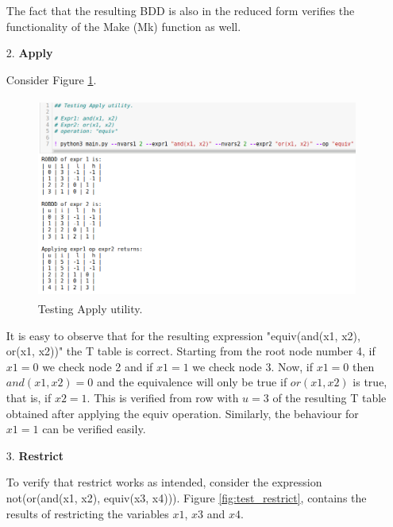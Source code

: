 \documentclass[a4paper, titlepage, 12pt]{article}
\numberwithin{equation}{section}
\begin{document}
\begin{itemize}
                    The fact that the resulting BDD is also in the reduced form verifies the functionality of the Make (Mk) function as well.
                \item[2.] \textbf{Apply}
                    
                    Consider Figure \ref{fig:test_apply}.

                    \begin{figure}[htp]
                        \centering
                        \includegraphics[height=250px, width=400px]{img/test_apply.png}
                        \caption{Testing Apply utility.}
                        \label{fig:test_apply}
                    \end{figure}

                    It is easy to observe that for the resulting expression "equiv(and(x1, x2), or(x1, x2))" the T table is correct.
                    Starting from the root node number 4, if $x1 = 0$ we check node 2 and if $x1 = 1$ we check node 3.
                    Now, if $x1 = 0$ then $and(x1, x2) = 0$ and the equivalence will only be true if $or(x1, x2)$ is true, that is, if $x2 = 1$.
                    This is verified from row with $u = 3$ of the resulting T table obtained after applying the equiv operation.
                    Similarly, the behaviour for $x1 = 1$ can be verified easily.

                \item[3.] \textbf{Restrict}

                    To verify that restrict works as intended, consider the expression not(or(and(x1, x2), equiv(x3, x4))).
                    Figure \ref{fig:test_restrict}, contains the results of restricting the variables $x1$, $x3$ and $x4$.


\end{itemize}
\end{document}
